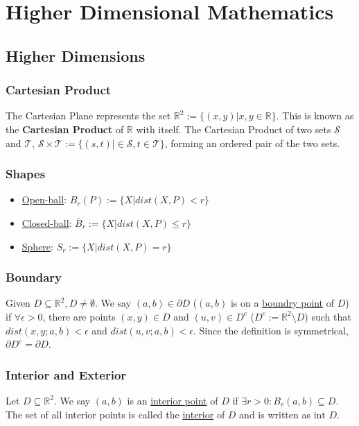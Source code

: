 \documentclass[11 pt, twoside]{article}
\begin{document}
\section{Higher Dimensional Mathematics}

\subsection{Higher Dimensions}
\subsubsection{Cartesian Product}
The Cartesian Plane represents the set $\mathbb{R}^2 := \{(x, y) | x, y\in \mathbb{R}\}$. This is known as the \textbf{Cartesian Product} of $\mathbb{R}$ with
itself. The Cartesian Product of two sets $\mathcal{S}$ and $\mathcal{T}$,
$\mathcal{S} \times \mathcal{T} :=  \{(s, t) | \in\mathcal{S},
t\in\mathcal{T}\}$, forming an ordered pair of the two sets.

\subsubsection{Shapes}
\begin{itemize}
\item \underline{Open-ball}:
$B_r(P) := \{X|dist(X, P) < r\}$
\item \underline{Closed-ball}:
$\bar{B}_r := \{X| dist(X, P) \leq r\}$
\item \underline{Sphere}:
$S_r := \{X|dist(X, P) = r\}$
\end{itemize}

\subsubsection{Boundary}
Given $D \subseteq \mathbb{R}^2, D \neq \emptyset$. We say $(a, b) \in
\partial D$ ($(a, b)$ is on a \underline{boundry point} of $D$) if $\forall
\epsilon > 0$, there are points $(x, y)\in D$ and $(u, v) \in D^c$ ($D^c :=
\mathbb{R}^2 \setminus D$) such that $dist(x, y; a, b) < \epsilon$ and
$dist(u, v; a, b) < \epsilon$. Since the definition is symmetrical, $\partial D^c = \partial D$.

\subsubsection{Interior and Exterior}
Let $D \subseteq \mathbb{R}^2$. We say $(a, b)$ is an
\underline{interior point} of $D$ if $\exists r > 0:B_r(a, b)\subseteq D$.
The set of all interior points is called the \underline{interior} of $D$ and is
written as $\text{int } D$.
\end{document}
